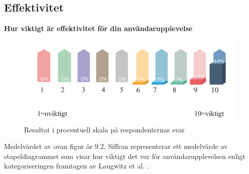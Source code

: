 \subsection{Effektivitet}

\centerline{\textbf{Hur viktigt är effektivitet för 
din användarupplevelse}}
\begin{figure}[H]
  \centering
  \includegraphics[scale=0.7]{Rityta_9.pdf}
\centering
\captionsetup{justification=centering,margin=2cm}
\caption{Resultat i procentuell skala på respondenternas svar}
\end{figure} 

Medelvärdet av ovan figur är 9.2. Siffran representerar ett medelvärde av stapeldiagrammet som visar hur viktigt det var för användarupplevelsen enligt kategoriseringen framtagen av Laugwitz et al. \cite{Laugwitz2008ConstructionQuestionnaire}.



